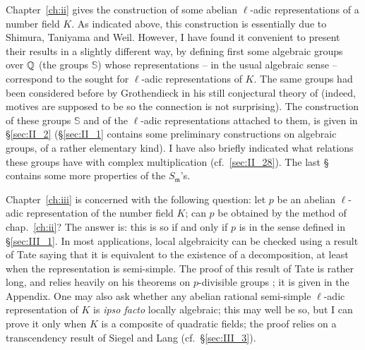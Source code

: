 Chapter~\ref{ch:ii} gives the construction of some abelian $\ell$-adic
representations of a number field $K$. As indicated above, this construction is
essentially due to Shimura, Taniyama and Weil. However, I have found it
convenient to present their results in a slightly different way, by defining
first some algebraic groups over $\mathbb{Q}$ (the groups $\mathbb{S}$) whose
representations -- in the usual algebraic sense -- correspond to the sought for
$\ell$-adic representations of $K$.  The same groups had been considered before
by Grothendieck in his still conjectural theory of  (indeed,
motives are supposed to be  so
the connection is not surprising). The construction of these groups
$\mathbb{S}$ and of the $\ell$-adic representations attached to them, is given
in \S\ref{sec:II_2} (\S\ref{sec:II_1} contains some preliminary constructions
on algebraic groups, of a rather elementary kind). I have also briefly
indicated what relations these groups have with complex multiplication (cf.\
\ref{sec:II_28}). The last \S{} contains some more properties of the
$S_{\mathfrak{m}}$'s.

Chapter~\ref{ch:iii} is concerned with the following question: let $p$ be an
abelian $\ell$-adic representation of the number field $K$; can $p$ be obtained
by the method of chap.~\ref{ch:ii}?  The answer is: this is so if and only if
$p$ is \emph{\textquote{locally algebraic}} in the sense defined in
\S\ref{sec:III_1}.  In most applications, local algebraicity can be checked
using a result of Tate saying that it is equivalent to the existence of a
\textquote{Hodge-Tate} decomposition, at least when the representation is
semi-simple. The proof of this result of Tate is rather long, and relies
heavily on his theorems on $p$-divisible groups \cite{39}; it is given in the
Appendix.  One may also ask whether any abelian rational semi-simple
$\ell$-adic representation of $K$ is \emph{ipso facto} locally algebraic; this
may well be so, but I can prove it only when $K$ is a composite of quadratic
fields; the proof relies on a transcendency result of Siegel and Lang (cf.\
\S\ref{sec:III_3}).


